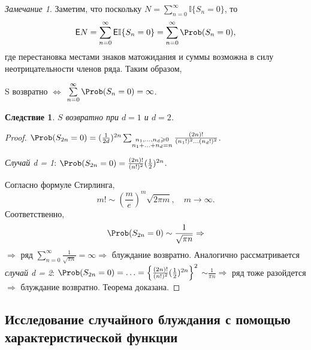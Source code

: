 \documentclass[a4paper]{article}
\newcommand{\Expect}{\mathsf{E}}
\theoremstyle{plain}
\newtheorem*{cor}{Следствие}
\theoremstyle{definition}
\theoremstyle{remark}
\newtheorem*{rem}{Замечание}
\begin{document}
\begin{rem}
  Заметим, что поскольку $N = \sum\limits_{n=0}^{\infty} \mathbb{I} \lbrace S_{n} = 0 \rbrace$, то
  \begin{equation*}
    \Expect N = \sum_{n=0}^{\infty} \Expect \mathbb{I} \lbrace S_{n} = 0 \rbrace = \sum\limits_{n=0}^{\infty} \Prob(S_{n} = 0),
  \end{equation*}
  где перестановка местами знаков матожидания и суммы возможна в силу неотрицательности членов ряда. Таким образом, \begin{center}
    S возвратно $\Leftrightarrow$ $\sum\limits_{n=0}^{\infty} \Prob(S_{n} = 0) = \infty$.
  \end{center}
\end{rem}

\begin{cor}
  $S$ возвратно при $d = 1$ и $d = 2$.
\end{cor}

\begin{proof}
  $\Prob(S_{2n} = 0) = (\frac{1}{2d})^{2n} \sum_{\substack{n_{1}, \ldots, n_{d} \geqslant 0 \\ n_{1} + \ldots + n_{d} = n}} \frac{(2n)!}{(n_{1}!)^{2} \ldots (n_{d}!)^{2}}$.
  \begin{flushleft}
    \emph{Случай d = 1}: $\Prob(S_{2n} = 0) = \frac{(2n)!}{(n!)^{2}}(\frac{1}{2})^{2n}$.
  \end{flushleft}Согласно формуле Стирлинга,
  \begin{equation*}
    m! \sim \left(\frac{m}{e}\right)^{m} \sqrt{2 \pi m}, \quad m \rightarrow \infty.
  \end{equation*}
  Соответственно,
  \begin{equation*}
    \Prob(S_{2n} = 0) \sim \frac{1}{\sqrt{\pi n}} \Rightarrow
  \end{equation*}
  $\Rightarrow$ ряд $\sum\limits_{n=0}^{\infty} \frac{1}{\sqrt{\pi n}} = \infty \Rightarrow$ блуждание возвратно.
  Аналогично рассматривается \emph{случай d = 2}: $\Prob(S_{2n} = 0) = \ldots = \left\lbrace \frac{(2n)!}{(n!)^{2}}(\frac{1}{2})^{2n} \right\rbrace ^{2}$ $\sim \frac{1}{\pi n} \Rightarrow$ ряд тоже разойдется $\Rightarrow$ блуждание возвратно. Теорема доказана.
\end{proof}

\subsection{Исследование случайного блуждания с помощью характеристической функции}
\end{document}

